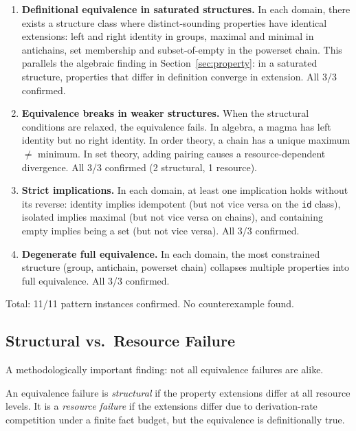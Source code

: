 \begin{enumerate}
\item \textbf{Definitional equivalence in saturated structures.} In each domain, there exists a structure class where distinct-sounding properties have identical extensions: left and right identity in groups, maximal and minimal in antichains, set membership and subset-of-empty in the powerset chain. This parallels the algebraic finding in Section~\ref{sec:property}: in a saturated structure, properties that differ in definition converge in extension. All 3/3 confirmed.

\item \textbf{Equivalence breaks in weaker structures.} When the structural conditions are relaxed, the equivalence fails. In algebra, a magma has left identity but no right identity. In order theory, a chain has a unique maximum $\neq$ minimum. In set theory, adding pairing causes a resource-dependent divergence. All 3/3 confirmed (2 structural, 1 resource).

\item \textbf{Strict implications.} In each domain, at least one implication holds without its reverse: identity implies idempotent (but not vice versa on the \texttt{id} class), isolated implies maximal (but not vice versa on chains), and containing empty implies being a set (but not vice versa). All 3/3 confirmed.

\item \textbf{Degenerate full equivalence.} In each domain, the most constrained structure (group, antichain, powerset chain) collapses multiple properties into full equivalence. All 3/3 confirmed.
\end{enumerate}

\noindent Total: 11/11 pattern instances confirmed. No counterexample found.

\subsection{Structural vs.\ Resource Failure}

A methodologically important finding: not all equivalence failures are alike.

\begin{definition}
An equivalence failure is \emph{structural} if the property extensions differ at all resource levels. It is a \emph{resource failure} if the extensions differ due to derivation-rate competition under a finite fact budget, but the equivalence is definitionally true.
\end{definition}

